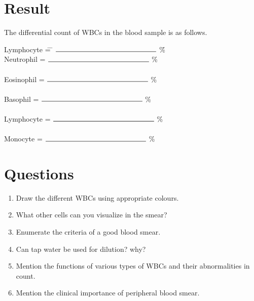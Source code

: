 \documentclass[a4paper,12pt,openany,twoside]{book}
\begin{document}
							\section*{Result}
							The differential count of WBCs in the blood sample is as follows.\vspace{.5cm}\\
							\begin{tabbing}
							Lymphocyte \= = \= $\rule{5cm}{0.5pt}$ \= \% \kill \\
							Neutrophil \> = \> $\rule{5cm}{0.5pt}$ \> \%\\
							\> \\
							Eosinophil \> = \> $\rule{5cm}{0.5pt}$ \> \%\\
							\> \\
							Basophil \> = \> $\rule{5cm}{0.5pt}$ \> \%\\
							\> \\
							Lymphocyte \> = \> $\rule{5cm}{0.5pt}$ \> \%\\
							\> \\
							Monocyte \> =\> $\rule{5cm}{0.5pt}$ \> \%\\
							\end{tabbing}

							\section*{Questions}
							\begin{enumerate}
								\item{Draw the different WBCs using appropriate colours.}
								\item{What other cells can you visualize in the smear?}
								\item{Enumerate the criteria of a good blood smear.}
								\item{Can tap water be used for dilution? why?}
								\item{Mention the functions of various types of WBCs and their abnormalities in count.}
								\item{Mention the clinical importance of peripheral blood smear.}
							\end{enumerate}

							\newpage
\end{document}
